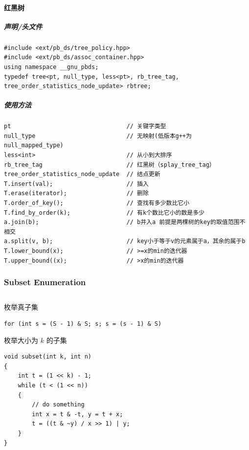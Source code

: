 \documentclass[twoside]{article}
\begin{document}
\paragraph{红黑树}
\subparagraph{声明/头文件}
\begin{lstlisting}
#include <ext/pb_ds/tree_policy.hpp>
#include <ext/pb_ds/assoc_container.hpp>
using namespace __gnu_pbds;
typedef tree<pt, null_type, less<pt>, rb_tree_tag, tree_order_statistics_node_update> rbtree;
\end{lstlisting}
\subparagraph{使用方法}
\begin{lstlisting}
pt                                 // 关键字类型
null_type                          // 无映射(低版本g++为null_mapped_type)
less<int>                          // 从小到大排序
rb_tree_tag                        // 红黑树（splay_tree_tag）
tree_order_statistics_node_update  // 结点更新
T.insert(val);                     // 插入
T.erase(iterator);                 // 删除
T.order_of_key();                  // 查找有多少数比它小
T.find_by_order(k);                // 有k个数比它小的数是多少
a.join(b);                         // b并入a 前提是两棵树的key的取值范围不相交
a.split(v, b);                     // key小于等于v的元素属于a，其余的属于b
T.lower_bound(x);                  // >=x的min的迭代器
T.upper_bound((x);                 // >x的min的迭代器
\end{lstlisting}
\subsubsection{Subset Enumeration}
\begin{lstlisting}
\end{lstlisting}
枚举真子集
\begin{lstlisting}
for (int s = (S - 1) & S; s; s = (s - 1) & S)
\end{lstlisting}
枚举大小为 $k$ 的子集
\begin{lstlisting}
void subset(int k, int n)
{
    int t = (1 << k) - 1;
    while (t < (1 << n))
    {
        // do something
        int x = t & -t, y = t + x;
        t = ((t & ~y) / x >> 1) | y;
    }
}\end{lstlisting}
\end{document}
